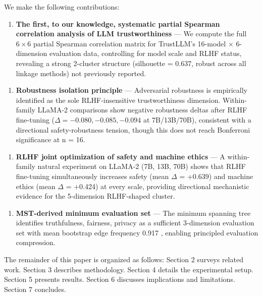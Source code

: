 We make the following contributions:

\begin{enumerate}
\item \textbf{The first, to our knowledge, systematic partial Spearman correlation analysis of LLM trustworthiness} --- We compute the full $6\times 6$ partial Spearman correlation matrix for TrustLLM's 16-model $\times$ 6-dimension evaluation data, controlling for model scale and RLHF status, revealing a strong 2-cluster structure (silhouette = 0.637, robust across all linkage methods) not previously reported.
\end{enumerate}

\begin{enumerate}
\item \textbf{Robustness isolation principle} --- Adversarial robustness is empirically identified as the sole RLHF-insensitive trustworthiness dimension. Within-family LLaMA-2 comparisons show negative robustness deltas after RLHF fine-tuning ($\Delta = -0.080, -0.085, -0.094$ at 7B/13B/70B), consistent with a directional safety-robustness tension, though this does not reach Bonferroni significance at n = 16.
\end{enumerate}

\begin{enumerate}
\item \textbf{RLHF joint optimization of safety and machine ethics} --- A within-family natural experiment on LLaMA-2 (7B, 13B, 70B) shows that RLHF fine-tuning simultaneously increases safety (mean $\Delta$ = +0.639) and machine ethics (mean $\Delta$ = +0.424) at every scale, providing directional mechanistic evidence for the 5-dimension RLHF-shaped cluster.
\end{enumerate}

\begin{enumerate}
\item \textbf{MST-derived minimum evaluation set} --- The minimum spanning tree identifies {truthfulness, fairness, privacy} as a sufficient 3-dimension evaluation set with mean bootstrap edge frequency 0.917 \citep{Tumminello2007MST}, enabling principled evaluation compression.
\end{enumerate}

The remainder of this paper is organized as follows: Section 2 surveys related work. Section 3 describes methodology. Section 4 details the experimental setup. Section 5 presents results. Section 6 discusses implications and limitations. Section 7 concludes.

